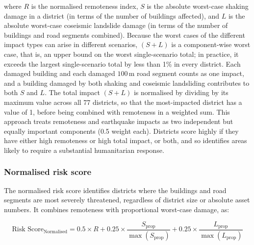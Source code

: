 \documentclass[preprint,12pt,authoryear]{elsarticle}
\begin{document}
where $R$ is the normalised remoteness index, $S$ is the absolute worst-case shaking damage in a district (in terms of the number of buildings affected), and $L$ is the absolute worst-case coseismic landslide damage (in terms of the number of buildings and road segments combined). Because the worst cases of the different impact types can arise in different scenarios, $(S + L)$ is a component-wise worst case, that is, an upper bound on the worst single-scenario total; in practice, it exceeds the largest single-scenario total by less than 1\% in every district. Each damaged building and each damaged $100\,\text{m}$ road segment counts as one impact, and a building damaged by both shaking and coseismic landsliding contributes to both $S$ and $L$. The total impact $(S + L)$ is normalised by dividing by its maximum value across all 77 districts, so that the most-impacted district has a value of 1, before being combined with remoteness in a weighted sum. This approach treats remoteness and earthquake impacts as two independent but equally important components (0.5 weight each). Districts score highly if they have either high remoteness or high total impact, or both, and so identifies areas likely to require a substantial humanitarian response.

\subsubsection{Normalised risk score}

The normalised risk score identifies districts where the buildings and road segments are most severely threatened, regardless of district size or absolute asset numbers. It combines remoteness with proportional worst-case damage, as:

\begin{equation}
\label{eq:normalized-risk-score}
\text{Risk Score}_{\text{Normalised}} = 0.5 \times R + 0.25 \times \frac{S_{\text{prop}}}{\max(S_{\text{prop}})} + 0.25 \times \frac{L_{\text{prop}}}{\max(L_{\text{prop}})}
\end{equation}
\end{document}
